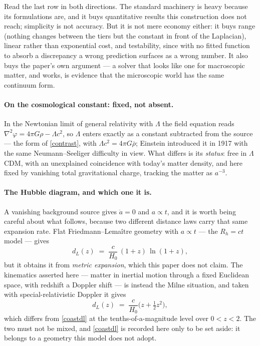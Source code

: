 \documentclass[11pt]{article}
\newcommand{\grad}{\nabla}
\begin{document}
\noindent Read the last row in both directions. The standard machinery is heavy because its formulations are,
and it buys quantitative results this construction does not reach; simplicity is not accuracy. But it is not mere
economy either: it buys range (nothing changes between the tiers but the constant in front of the Laplacian),
linear rather than exponential cost, and testability, since with no fitted function to absorb a discrepancy a
wrong prediction surfaces as a wrong number. It also buys the paper's own argument --- a solver that looks like
one for macroscopic matter, and works, is evidence that the microscopic world has the same continuum form.

\paragraph{On the cosmological constant: fixed, not absent.} In the Newtonian limit of general relativity with
$\Lambda$ the field equation reads $\grad^2\varphi=4\pi G\rho-\Lambda c^2$, so $\Lambda$ enters exactly as a
constant subtracted from the source --- the form of \eqref{contrast}, with $\Lambda c^2=4\pi G\bar\rho$; Einstein
introduced it in 1917 with the same Neumann--Seeliger difficulty in view. What differs is its \emph{status}: free
in $\Lambda$CDM, with an unexplained coincidence with today's matter density, and here fixed by vanishing total
gravitational charge, tracking the matter as $a^{-3}$.

\paragraph{The Hubble diagram, and which one it is.} A vanishing background source gives $\ddot a=0$ and
$a\propto t$, and it is worth being careful about what follows, because two different distance laws carry that
same expansion rate. Flat Friedmann--Lema\^itre geometry with $a\propto t$ --- the $R_h=ct$ model --- gives
\begin{equation}\label{coastdl}
d_L(z) \;=\; \frac{c}{H_0}\,(1+z)\,\ln(1+z),
\end{equation}
but it obtains it from \emph{metric expansion}, which this paper does not claim. The kinematics asserted here ---
matter in inertial motion through a fixed Euclidean space, with redshift a Doppler shift --- is instead the Milne
situation, and taken with special-relativistic Doppler it gives
\begin{equation}\label{milnedl}
d_L(z) \;=\; \frac{c}{H_0}\Big(z+\tfrac12 z^2\Big),
\end{equation}
which differs from \eqref{coastdl} at the tenths-of-a-magnitude level over $0<z<2$. The two must not be mixed,
and \eqref{coastdl} is recorded here only to be set aside: it belongs to a geometry this model does not adopt.
\end{document}
